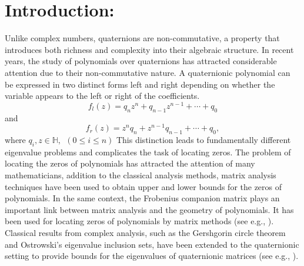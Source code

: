 \documentclass [12pt]{article}
\begin{document}
\section{Introduction:} 
\noindent  Unlike complex numbers, quaternions are non-commutative, a property that introduces both richness and complexity into their algebraic structure. In recent years, the study of polynomials over quaternions has attracted considerable attention due to their non-commutative nature. A quaternionic polynomial can be expressed in two distinct forms left and right depending on whether the variable appears to the left or right of the coefficients.\\  
$$f_l(z) = q_n z^n + q_{n-1} z^{n-1} + \cdots + q_0$$  
and
$$f_r(z) = z^n q_n + z^{n-1} q_{n-1} + \cdots + q_0,$$   
where $q_{i}, z \in\mathbb{H},~~ (0 \le i \le n)$
\noindent This distinction leads to fundamentally different eigenvalue problems and complicates the task of locating zeros. The problem of locating the zeros of polynomials has attracted the attention
of many mathematicians, addition to the classical analysis methods, matrix analysis techniques have been used to obtain upper and lower bounds for the zeros of polynomials. In the same context, the Frobenius companion matrix plays an important link
between matrix analysis and the geometry of polynomials. It has been used for
locating zeros of polynomials by matrix methods (see e.g., \cite{ASS2,DR}). Classical results from complex analysis, such as the Gershgorin circle theorem and Ostrowski’s eigenvalue inclusion sets, have been extended to the quaternionic setting to provide bounds for the eigenvalues of quaternionic matrices (see e.g., \cite{ASS}). 
\end{document}
